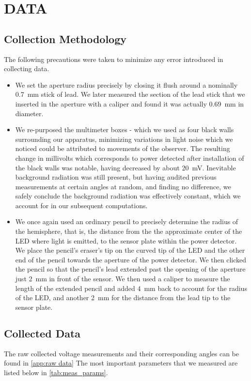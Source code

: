 \section{DATA}
\subsection{Collection Methodology}
The following precautions were taken to minimize any error introduced in collecting data.

\begin{itemize}
    \item We set the aperture radius precisely by closing it flush around a nominally \SI{.7}{mm} stick of lead. We later measured the section of the lead stick that we inserted in the aperture with a caliper and found it was actually \SI{.69}{mm} in diameter.
    \item We re-purposed the multimeter boxes - which we used as four black walls surrounding our apparatus, minimizing variations in light noise which we noticed could be attributed to movements of the observer. The resulting change in millivolts which corresponds to power detected after installation of the black walls was notable, having decreased by about \SI{20}{\milli\volt}. Inevitable background radiation was still present, but having audited previous measurements at certain angles at random, and finding no difference, we safely conclude the background radiation was effectively constant, which we account for in our subsequent computations.
    \item We once again used an ordinary pencil to precisely determine the radius of the hemisphere, that is, the distance from the the approximate center of the LED where light is emitted, to the sensor plate within the power detector. We place the pencil's eraser's tip on the curved tip of the LED and the other end of the pencil towards the aperture of the power detector. We then clicked the pencil so that the pencil's lead extended past the opening of the aperture just \SI{2}{mm} in front of the sensor. We then used a caliper to measure the length of the extended pencil and added \SI{4}{mm} back to account for the radius of the LED, and another \SI{2}{mm} for the distance from the lead tip to the sensor plate.
\end{itemize}

\newpage
\subsection{Collected Data}
The raw collected voltage measurements and their corresponding angles can be found in \autoref{app:raw data} The most important parameters that we measured are listed below in \autoref{tab:meas_params}.


